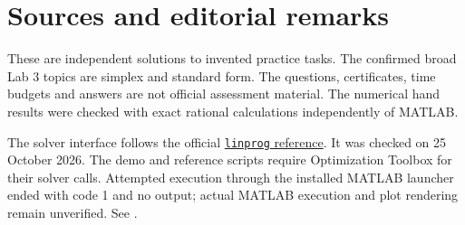 \documentclass[11pt,a4paper]{article}
\begin{document}
\section{Sources and editorial remarks}
These are independent solutions to invented practice tasks. The confirmed
broad Lab 3 topics are simplex and standard form. The questions, certificates, time budgets and answers are
not official assessment material. The numerical hand results were checked
with exact rational calculations independently of MATLAB.

The solver interface follows the official
\href{https://www.mathworks.com/help/optim/ug/linprog.html}{\texttt{linprog} reference}.
It was checked on 25 October 2026. The demo and reference scripts require Optimization
Toolbox for their solver calls. Attempted execution through the installed MATLAB
launcher ended with code 1 and no output; actual MATLAB execution and plot
rendering remain unverified. See .
\end{document}
